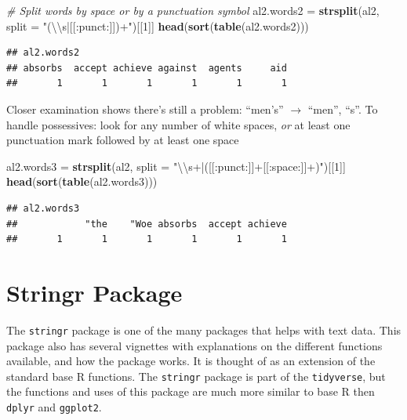 \documentclass[
]{book}
\newenvironment{Shaded}{\begin{snugshade}}{\end{snugshade}}
\newcommand{\CharTok}[1]{\textcolor[rgb]{0.31,0.60,0.02}{#1}}
\newcommand{\CommentTok}[1]{\textcolor[rgb]{0.56,0.35,0.01}{\textit{#1}}}
\newcommand{\DataTypeTok}[1]{\textcolor[rgb]{0.13,0.29,0.53}{#1}}
\newcommand{\DecValTok}[1]{\textcolor[rgb]{0.00,0.00,0.81}{#1}}
\newcommand{\KeywordTok}[1]{\textcolor[rgb]{0.13,0.29,0.53}{\textbf{#1}}}
\newcommand{\NormalTok}[1]{#1}
\newcommand{\StringTok}[1]{\textcolor[rgb]{0.31,0.60,0.02}{#1}}
\begin{document}
\begin{Shaded}
\begin{Highlighting}[]
\CommentTok{# Split words by space or by a punctuation symbol}
\NormalTok{al2.words2 =}\StringTok{ }\KeywordTok{strsplit}\NormalTok{(al2, }\DataTypeTok{split =} \StringTok{"(}\CharTok{\textbackslash{}\textbackslash{}}\StringTok{s|[[:punct:]])+"}\NormalTok{)[[}\DecValTok{1}\NormalTok{]]}
\KeywordTok{head}\NormalTok{(}\KeywordTok{sort}\NormalTok{(}\KeywordTok{table}\NormalTok{(al2.words2)))}
\end{Highlighting}
\end{Shaded}

\begin{verbatim}
## al2.words2
## absorbs  accept achieve against  agents     aid 
##       1       1       1       1       1       1
\end{verbatim}

Closer examination shows there's still a problem: ``men's'' \(\rightarrow\) ``men'', ``s''.
To handle possessives: look for any number of white spaces, \emph{or} at least one punctuation mark followed by at least one space

\begin{Shaded}
\begin{Highlighting}[]
\NormalTok{al2.words3 =}\StringTok{ }\KeywordTok{strsplit}\NormalTok{(al2, }\DataTypeTok{split =} \StringTok{"}\CharTok{\textbackslash{}\textbackslash{}}\StringTok{s+|([[:punct:]]+[[:space:]]+)"}\NormalTok{)[[}\DecValTok{1}\NormalTok{]]}
\KeywordTok{head}\NormalTok{(}\KeywordTok{sort}\NormalTok{(}\KeywordTok{table}\NormalTok{(al2.words3)))}
\end{Highlighting}
\end{Shaded}

\begin{verbatim}
## al2.words3
##            "the    "Woe absorbs  accept achieve 
##       1       1       1       1       1       1
\end{verbatim}

\hypertarget{stringr-package}{%
\section{Stringr Package}\label{stringr-package}}

The \texttt{stringr} package is one of the many packages that helps with text data. This package also has several vignettes with explanations on the different functions available, and how the package works. It is thought of as an extension of the standard base R functions. The \texttt{stringr} package is part of the \texttt{tidyverse}, but the functions and uses of this package are much more similar to base R then \texttt{dplyr} and \texttt{ggplot2}.
\end{document}
